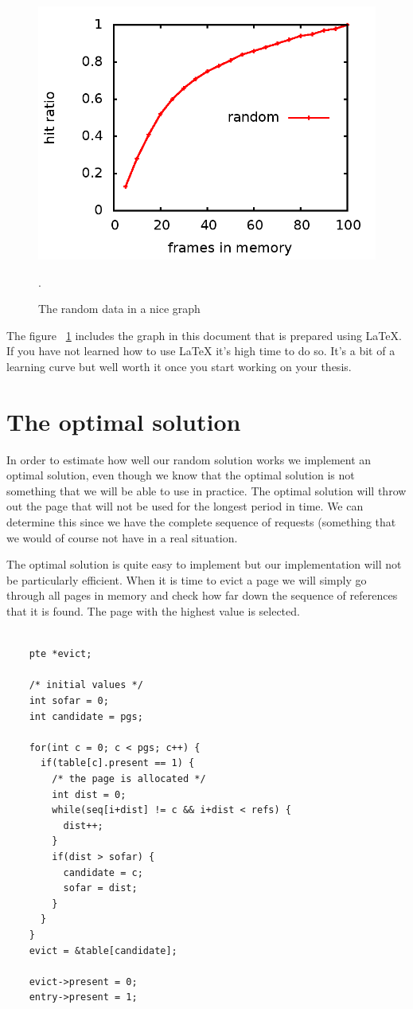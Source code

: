 \documentclass[a4paper,11pt]{article}
\begin{document}
\begin{figure}[ht]
  \centering
  \includegraphics[scale=0.4]{random.png}
  \caption{The random data in a nice graph}.
  \label{fig:random}
\end{figure}
   
The figure ~\ref{fig:random} includes the graph in this document that
is prepared using \LaTeX. If you have not learned how to use \LaTeX
it's high time to do so. It's a bit of a learning curve but well worth
it once you start working on your thesis.

\section{The optimal solution}

In order to estimate how well our random solution works we implement
an optimal solution, even though we know that the optimal solution is
not something that we will be able to use in practice. The optimal
solution will throw out the page that will not be used for the longest
period in time. We can determine this since we have the complete
sequence of requests (something that we would of course not have in a
real situation.

The optimal solution is quite easy to implement but our implementation
will not be particularly efficient. When it is time to evict a page we
will simply go through all pages in memory and check how far down the
sequence of references that it is found. The page with the highest
value is selected.

\begin{lstlisting}

	pte *evict;

	/* initial values */
	int sofar = 0;
	int candidate = pgs;
	
	for(int c = 0; c < pgs; c++) {
	  if(table[c].present == 1) {
	    /* the page is allocated */
	    int dist = 0;
	    while(seq[i+dist] != c && i+dist < refs) {
	      dist++;
	    }
	    if(dist > sofar) {
	      candidate = c;
	      sofar = dist;
	    }
	  }
	}
	evict = &table[candidate];

	evict->present = 0;
	entry->present = 1;

\end{lstlisting}
\end{document}
